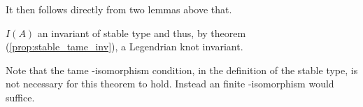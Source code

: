 It then follows directly from two lemmas above that.
\begin{them}
$I(A)$ an invariant of stable type and thus, by theorem
(\ref{prop:stable_tame_inv}), a Legendrian knot invariant.
\end{them}

Note that the tame \Ainf-isomorphism condition, in the definition of the stable type,
is not necessary for this theorem to hold. Instead an finite \Ainf-isomorphism
would suffice.




